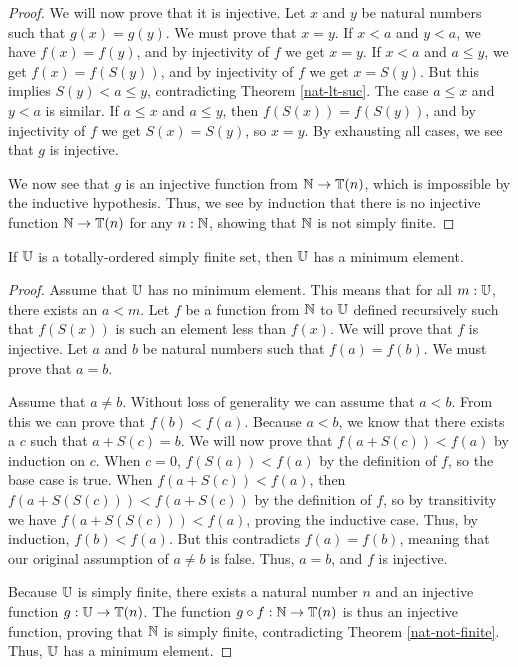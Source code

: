 \documentclass[../math.tex]{subfiles}
\begin{document}
\begin{proof}
    We will now prove that it is injective.  Let $x$ and $y$ be natural numbers
    such that $g(x) = g(y)$.  We must prove that $x = y$.  If $x < a$ and $y <
    a$, we have $f(x) = f(y)$, and by injectivity of $f$ we get $x = y$.  If $x
    < a$ and $a \leq y$, we get $f(x) = f(S(y))$, and by injectivity of $f$ we
    get $x = S(y)$.  But this implies $S(y) < a \leq y$, contradicting Theorem
    \ref{nat-lt-suc}.  The case $a \leq x$ and $y < a$ is similar.  If $a \leq
    x$ and $a \leq y$, then $f(S(x)) = f(S(y))$, and by injectivity of $f$ we
    get $S(x) = S(y)$, so $x = y$.  By exhausting all cases, we see that $g$ is
    injective.

    We now see that $g$ is an injective function from $\mathbb{N} \to \mathbb{T}(n)$, which is
    impossible by the inductive hypothesis.  Thus, we see by induction that
    there is no injective function $\mathbb{N} \to \mathbb{T}(n)$ for any $n : \mathbb{N}$, showing that
    $\mathbb{N}$ is not simply finite.
\end{proof}

\begin{theorem} \label{simple-finite-min}
    If $\mathbb{U}$ is a totally-ordered simply finite set, then $\mathbb{U}$ has a minimum
    element.
\end{theorem}
\begin{proof}
    Assume that $\mathbb{U}$ has no minimum element.  This means that for all $m : \mathbb{U}$,
    there exists an $a < m$.  Let $f$ be a function from $\mathbb{N}$ to $\mathbb{U}$ defined
    recursively such that $f(S(x))$ is such an element less than $f(x)$.  We
    will prove that $f$ is injective.  Let $a$ and $b$ be natural numbers such
    that $f(a) = f(b)$.  We must prove that $a = b$.

    Assume that $a \neq b$.  Without loss of generality we can assume that $a <
    b$.  From this we can prove that $f(b) < f(a)$.  Because $a < b$, we know
    that there exists a $c$ such that $a + S(c) = b$.  We will now prove that
    $f(a + S(c)) < f(a)$ by induction on $c$.  When $c = 0$, $f(S(a)) < f(a)$ by
    the definition of $f$, so the base case is true.  When $f(a + S(c)) < f(a)$,
    then $f(a + S(S(c))) < f(a + S(c))$ by the definition of $f$, so by
    transitivity we have $f(a + S(S(c))) < f(a)$, proving the inductive case.
    Thus, by induction, $f(b) < f(a)$.  But this contradicts $f(a) = f(b)$,
    meaning that our original assumption of $a \neq b$ is false.  Thus, $a = b$,
    and $f$ is injective.

    Because $\mathbb{U}$ is simply finite, there exists a natural number $n$ and an
    injective function $g : \mathbb{U} \to \mathbb{T}(n)$.  The function $g \circ f : \mathbb{N} \to
    \mathbb{T}(n)$ is thus an injective function, proving that $\mathbb{N}$ is simply finite,
    contradicting Theorem \ref{nat-not-finite}.  Thus, $\mathbb{U}$ has a minimum
    element.
\end{proof}
\end{document}

